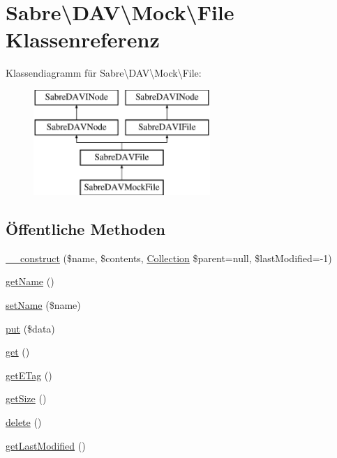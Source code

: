 \hypertarget{class_sabre_1_1_d_a_v_1_1_mock_1_1_file}{}\section{Sabre\textbackslash{}D\+AV\textbackslash{}Mock\textbackslash{}File Klassenreferenz}
\label{class_sabre_1_1_d_a_v_1_1_mock_1_1_file}
Klassendiagramm für Sabre\textbackslash{}D\+AV\textbackslash{}Mock\textbackslash{}File\+:\begin{figure}[H]
\begin{center}
\leavevmode
\includegraphics[height=4.000000cm]{class_sabre_1_1_d_a_v_1_1_mock_1_1_file}
\end{center}
\end{figure}
\subsection*{Öffentliche Methoden}
\begin{DoxyCompactItemize}
\item 
\mbox{\hyperlink{class_sabre_1_1_d_a_v_1_1_mock_1_1_file_add4718d9344db4d4830542605c232a7b}{\+\_\+\+\_\+construct}} (\$name, \$contents, \mbox{\hyperlink{class_sabre_1_1_d_a_v_1_1_collection}{Collection}} \$parent=null, \$last\+Modified=-\/1)
\item 
\mbox{\hyperlink{class_sabre_1_1_d_a_v_1_1_mock_1_1_file_aea750206fc0c59d516357349b1e7d6e1}{get\+Name}} ()
\item 
\mbox{\hyperlink{class_sabre_1_1_d_a_v_1_1_mock_1_1_file_af7fc32874a561f416150bbcb4e9c856c}{set\+Name}} (\$name)
\item 
\mbox{\hyperlink{class_sabre_1_1_d_a_v_1_1_mock_1_1_file_ab824c0a6b0467e31e5af15993713b8e9}{put}} (\$data)
\item 
\mbox{\hyperlink{class_sabre_1_1_d_a_v_1_1_mock_1_1_file_a680bfbc05027d3b00e3dc7198e6d4172}{get}} ()
\item 
\mbox{\hyperlink{class_sabre_1_1_d_a_v_1_1_mock_1_1_file_a9654d2fd0b81900d1c75bf3d7129d0be}{get\+E\+Tag}} ()
\item 
\mbox{\hyperlink{class_sabre_1_1_d_a_v_1_1_mock_1_1_file_aca58982336f6d9a272cd3617b56fce39}{get\+Size}} ()
\item 
\mbox{\hyperlink{class_sabre_1_1_d_a_v_1_1_mock_1_1_file_a1c6762500d4b0da7256e9e6e0f87beb3}{delete}} ()
\item 
\mbox{\hyperlink{class_sabre_1_1_d_a_v_1_1_mock_1_1_file_a1d26087aae6d48c20b485368e1dcc511}{get\+Last\+Modified}} ()
\end{DoxyCompactItemize}
